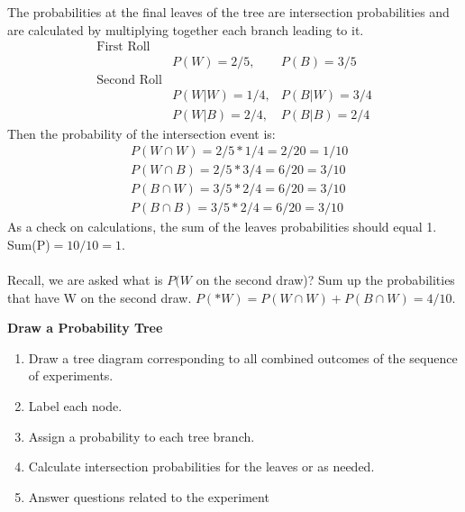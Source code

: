 \documentclass[14pt]{extarticle}
\begin{document}
\\\\
The probabilities at the final leaves of the tree are intersection probabilities and are calculated by multiplying together each branch leading to it.
\begin{align*}
	\text{First Roll}&  \\
	&P(W) = 2/5, & P(B)=3/5 \\
	\text{Second Roll}&  \\
	&P(W|W) = 1/4, & P(B|W)=3/4 \\
	&P(W|B) = 2/4, & P(B|B)=2/4
\end{align*}
Then the probability of the intersection event is:
\begin{align*}
	&P(W\cap W) = 2/5 * 1/4 = 2/20 = 1/10 \\
	&P(W\cap B) = 2/5 * 3/4 = 6/20 = 3/10 \\
	&P(B\cap W) = 3/5 * 2/4 = 6/20 = 3/10 \\
	&P(B\cap B) = 3/5 * 2/4 = 6/20 = 3/10
\end{align*}
As a check on calculations, the sum of the leaves probabilities should equal 1. Sum(P)$=10/10=1$.
\\\\
Recall, we are asked what is $P(W$ on the second draw)? Sum up the probabilities that have W on the second draw. $P(*W) = P(W\cap W) + P(B\cap W) = 4/10$.

\begin{tcolorbox}[enhanced jigsaw,colback=bg,boxrule=0pt,arc=0pt] 
	\textbf{Draw a Probability Tree}
	\begin{enumerate}
		\item Draw a tree diagram corresponding to all combined outcomes of the sequence of experiments.
		\item Label each node.
		\item Assign a probability to each tree branch.
		\item Calculate intersection probabilities for the leaves or as needed.
		\item Answer questions related to the experiment
	\end{enumerate}
\end{tcolorbox}
\end{document}
